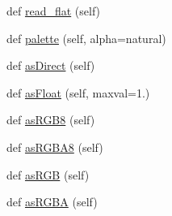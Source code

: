 \begin{DoxyCompactItemize}
\item 
def \hyperlink{classlib_1_1png_1_1_reader_a90cb36f6dfd5c54e426b56eddc28415d}{read\+\_\+flat} (self)
\item 
def \hyperlink{classlib_1_1png_1_1_reader_a68fbc2d1cdf23f0844ab0b40fe4f0803}{palette} (self, alpha=\textquotesingle{}natural\textquotesingle{})
\item 
def \hyperlink{classlib_1_1png_1_1_reader_adf97dda070dc0410c95f3873c30200a6}{as\+Direct} (self)
\item 
def \hyperlink{classlib_1_1png_1_1_reader_a096a287be3328813ad533c97b67d99a0}{as\+Float} (self, maxval=1.)
\item 
def \hyperlink{classlib_1_1png_1_1_reader_a69f44e7d9394ce45fefe711cd1ac03b5}{as\+R\+G\+B8} (self)
\item 
def \hyperlink{classlib_1_1png_1_1_reader_a2e3c246de50a87e148a43ba42f6faac0}{as\+R\+G\+B\+A8} (self)
\item 
def \hyperlink{classlib_1_1png_1_1_reader_a6ca94eae486ee2820a2487a12c42a2c0}{as\+R\+GB} (self)
\item 
def \hyperlink{classlib_1_1png_1_1_reader_a245e000fa789414e0caa35e98fae3f08}{as\+R\+G\+BA} (self)
\end{DoxyCompactItemize}
